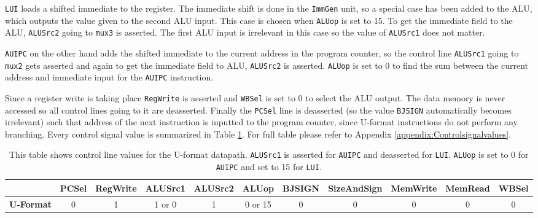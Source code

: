         \texttt{LUI} loads a shifted immediate to the register. The immediate shift is done in the \texttt{ImmGen} unit, so a special case has been added to the ALU, which outputs the value given to the second ALU input. This case is chosen when \texttt{ALUop} is set to 15. 
        To get the immediate field to the ALU, \texttt{ALUSrc2} going to \texttt{mux3} is asserted.
        The first ALU input is irrelevant in this case so the value of \texttt{ALUSrc1} does not matter. 
        
         \texttt{AUIPC} on the other hand adds the shifted immediate to the current address in the program counter, so the control line \texttt{ALUSrc1} going to \texttt{mux2} gets asserted and again to get the immediate field to ALU, \texttt{ALUSrc2} is asserted. \texttt{ALUop} is set to 0 to find the sum between the current address and immediate input for the \texttt{AUIPC} instruction.
         
         Since a register write is taking place \texttt{RegWrite} is asserted and \texttt{WBSel} is set to 0 to select the ALU output. The data memory is never accessed so all control lines going to it are deasserted. Finally the \texttt{PCSel} line is deasserted (so the value \texttt{BJSIGN} automatically becomes irrelevant) such that address of the next instruction is inputted to the program counter, since U-format instructions do not perform any branching. Every control signal value is summarized in Table \ref{table:UFORMAT}. For full table please refer to Appendix \ref{appendix:Controlsignalvalues}.
    
        \begin{table}[h!]
            \small
            \hspace{-2.4cm}
            \begin{tabular}{|c||c|c|c|c|c|c|c|c|c|c|}
            	\hline
            	                  & \textbf{PCSel} & \textbf{RegWrite} & \textbf{ALUSrc1} & \textbf{ALUSrc2} & \textbf{ALUop} & \textbf{BJSIGN} & \textbf{SizeAndSign} & \textbf{MemWrite} & \textbf{MemRead} & \textbf{WBSel} \\ \hline\hline
            	\textbf{U-Format} &       0        &         1         &      1 or 0      &        1         &    0 or 15     &        0        &          0           &         0         &        0         &       0        \\ \hline
            \end{tabular}
            \caption{This table shows control line values for the U-format datapath. \texttt{ALUSrc1} is asserted for \texttt{AUIPC} and deasserted for \texttt{LUI}. \texttt{ALUop} is set to 0 for \texttt{AUIPC} and set to 15 for \texttt{LUI}.}
            \label{table:UFORMAT}
        \end{table}
    
